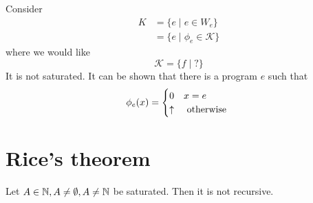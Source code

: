 \begin{example}
  Consider
  \begin{align*}
    K &= \{e \mid e\in W_e \} \\ 
    &= \{e \mid \phi_e\in \mathcal{K} \}
  \end{align*}
  where we would like
  \[   \mathcal{K} = \{f \mid ? \} \]
  It is not saturated. It can be shown that there is a program $e$ such that
  \begin{equation*}
    \phi_e(x) = \begin{cases}
      0 & x = e \\
      \uparrow & $ otherwise $
    \end{cases}
  \end{equation*}
\end{example}

\section {Rice's theorem}

\begin{theorem}
  Let $ A \in \mathbb{N}, A \neq \emptyset, A \neq \mathbb{N}$ be saturated.
  Then it is not recursive.
\end{theorem}

